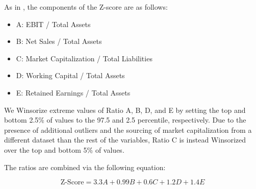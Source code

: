 \documentclass{article}[11pt]
\begin{document}
    As in \cite{das_credit_2023}, the components of the Z-score are as follows:

    \begin{itemize}
        \item A: EBIT / Total Assets
        \item B: Net Sales / Total Assets
        \item C: Market Capitalization / Total Liabilities
        \item D: Working Capital / Total Assets
        \item E: Retained Earnings / Total Assets
    \end{itemize}

    We Winsorize extreme values of Ratio A, B, D, and E by setting the top and bottom 2.5\% of values to the 97.5 and 2.5 percentile, respectively. Due to the presence of additional outliers and the sourcing of market capitalization from a different dataset than the rest of the variables, Ratio C is instead Winsorized over the top and bottom 5\% of values. 

    The ratios are combined via the following equation:

    \begin{equation*}
        \text{Z-Score} = 3.3 A + 0.99 B + 0.6 C + 1.2 D + 1.4 E
    \end{equation*}
\end{document}
